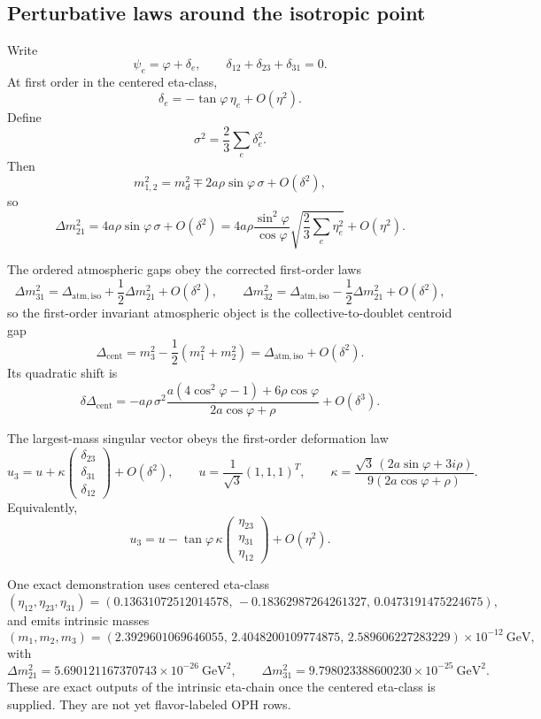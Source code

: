 \documentclass[11pt]{article}
\begin{document}
\subsection{Perturbative laws around the isotropic point}

Write
\[
\psi_e=\varphi+\delta_e,
\qquad
\delta_{12}+\delta_{23}+\delta_{31}=0.
\]
At first order in the centered eta-class,
\[
\delta_e=-\tan\varphi\,\eta_e+O(\eta^2).
\]
Define
\[
\sigma^2=\frac23\sum_e \delta_e^2.
\]
Then
\[
m_{1,2}^2=m_d^2\mp 2a\rho\sin\varphi\,\sigma+O(\delta^2),
\]
so
\[
\Delta m_{21}^2 = 4a\rho\sin\varphi\,\sigma+O(\delta^2)
=4a\rho\frac{\sin^2\varphi}{\cos\varphi}
\sqrt{\frac23\sum_e\eta_e^2}+O(\eta^2).
\]

The ordered atmospheric gaps obey the corrected first-order laws
\[
\Delta m_{31}^2 = \Delta_{\mathrm{atm,iso}} + \frac12\Delta m_{21}^2 + O(\delta^2),
\qquad
\Delta m_{32}^2 = \Delta_{\mathrm{atm,iso}} - \frac12\Delta m_{21}^2 + O(\delta^2),
\]
so the first-order invariant atmospheric object is the collective-to-doublet centroid gap
\[
\Delta_{\mathrm{cent}}=
m_3^2-\frac12(m_1^2+m_2^2)
=
\Delta_{\mathrm{atm,iso}}+O(\delta^2).
\]
Its quadratic shift is
\[
\delta\Delta_{\mathrm{cent}}
=
-
a\rho\,\sigma^2
\frac{a(4\cos^2\varphi-1)+6\rho\cos\varphi}
 {2a\cos\varphi+\rho}
+O(\delta^3).
\]

The largest-mass singular vector obeys the first-order deformation law
\[
u_3=
u+
\kappa
\begin{pmatrix}
\delta_{23}\\
\delta_{31}\\
\delta_{12}
\end{pmatrix}
+O(\delta^2),
\qquad
u=\frac1{\sqrt3}(1,1,1)^T,
\qquad
\kappa=
\frac{\sqrt3\,(2a\sin\varphi+3i\rho)}
 {9(2a\cos\varphi+\rho)}.
\]
Equivalently,
\[
u_3=
u-
\tan\varphi\,\kappa
\begin{pmatrix}
\eta_{23}\\
\eta_{31}\\
\eta_{12}
\end{pmatrix}
+O(\eta^2).
\]

One exact demonstration uses centered eta-class
\[
(\eta_{12},\eta_{23},\eta_{31})
=
(0.13631072512014578,\,-0.18362987264261327,\,0.0473191475224675),
\]
and emits intrinsic masses
\[
(m_1,m_2,m_3)=
(2.3929601069646055,\,
2.4048200109774875,\,
2.589606227283229)\times10^{-12}\ \mathrm{GeV},
\]
with
\[
\Delta m_{21}^2 = 5.690121167370743\times10^{-26}\ \mathrm{GeV}^2,
\qquad
\Delta m_{31}^2 = 9.798023388600230\times10^{-25}\ \mathrm{GeV}^2.
\]
These are exact outputs of the intrinsic eta-chain once the centered eta-class is supplied. They
are not yet flavor-labeled OPH rows.
\end{document}
